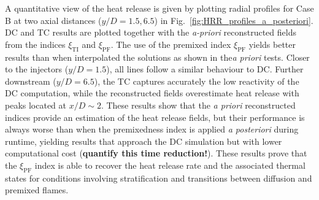 \documentclass[preprint,12pt,authoryear]{elsarticle}
\begin{document}
{A quantitative view of the heat release is given by plotting radial profiles for Case B at two axial distances ($y/D = 1.5, 6.5$) in Fig.~\ref{fig:HRR_profiles_a_posteriori}. DC and TC results are plotted together with the \textsl{a-priori} reconstructed fields from the indices $\xi_\mathrm{TI}$ and $\xi_\mathrm{PF}$. The use of the premixed index
$\xi_\mathrm{PF}$ 
yields better results than when interpolated the solutions as shown in the\textsl{a priori} tests. Closer to the injectors ($y/D = 1.5$), all lines follow a similar behaviour to DC. Further downstream ($y/D = 6.5$), the TC captures accurately the low reactivity of the DC computation, while the reconstructed fields overestimate heat release with peaks located at $x/D \sim 2$. These results show that the \textsl{a priori} reconstructed indices provide an estimation of the heat release fields, but their performance is always worse than when the premixedness index is applied \textsl{a posteriori} during runtime, yielding results that approach the DC simulation but with lower computational cost (\textbf{quantify this time reduction!}). 
These results prove that the $\xi_\mathrm{PF}$ index is able to recover the heat release rate and the associated thermal states for conditions involving stratification and transitions between diffusion and premixed flames. 

}
\end{document}
